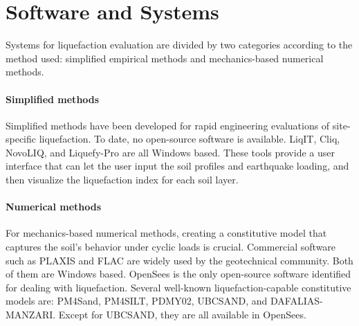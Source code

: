 \section{Software and Systems}
\label{sec:eq_liq_tools}

Systems for liquefaction evaluation are divided by two categories according to the method used: simplified empirical methods and mechanics-based numerical methods.

\paragraph{Simplified methods}
Simplified methods have been developed for rapid engineering evaluations of site-specific liquefaction. To date, no open-source software is available. LiqIT, Cliq, NovoLIQ, and Liquefy-Pro are all Windows based. These tools provide a user interface that can let the user input the soil profiles and earthquake loading, and then visualize the liquefaction index for each soil layer.

\paragraph{Numerical methods}
For mechanics-based numerical methods, creating a constitutive model that captures the soil’s behavior under cyclic loads is crucial. Commercial software such as PLAXIS and FLAC are widely used by the geotechnical community. Both of them are Windows based. OpenSees is the only open-source software identified for dealing with liquefaction. Several well-known liquefaction-capable constitutive models are: PM4Sand, PM4SILT, PDMY02, UBCSAND, and DAFALIAS-MANZARI. Except for UBCSAND, they are all available in OpenSees.
